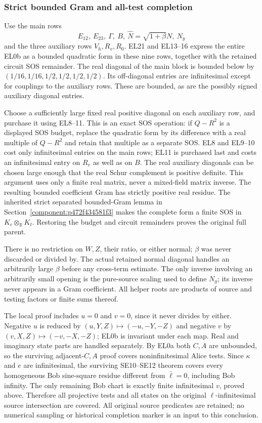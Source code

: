 \subsubsection*{Strict bounded Gram and all-test completion}
Use the main rows
\[
 E_{12},\ E_{23},\ \Gamma,\ B,\ \widehat N=\sqrt{1+\beta}N,
 \ N_y
\]
and the three auxiliary rows $V_h,R_v,R_0$.
EL21 and EL13--16 express the entire EL0b as a bounded quadratic
form in these nine rows, together with the retained circuit SOS
remainder.  The real diagonal of the main block is bounded below
by $(1/16,1/16,1/2,1/2,1/2,1/2)$.
Its off-diagonal entries are infinitesimal except for couplings to
the auxiliary rows.  These are bounded, as are the possibly signed
auxiliary diagonal entries.

Choose a sufficiently large fixed real positive diagonal on each
auxiliary row, and purchase it using EL8--11.  This is an exact
SOS operation: if $Q-R^2$ is a displayed SOS budget, replace the
quadratic form by its difference with a real multiple of $Q-R^2$
and retain that multiple as a separate SOS.  EL8 and EL9--10 cost
only infinitesimal entries on the main rows; EL11 is purchased
last and costs an infinitesimal entry on $R_v$ as well as on $B$.
The real auxiliary diagonals can be chosen large enough that the
real Schur complement is positive definite.  This argument uses
only a finite real matrix, never a mixed-field matrix inverse.
The resulting bounded coefficient Gram has strictly positive real
residue.  The inherited strict separated bounded-Gram lemma in
Section~\ref{component:p472f434581f3} makes the complete form a finite
SOS in $K_c\otimes_{\mathbb R}K_t$.  Restoring the budget and circuit
remainders proves the original full parent.

There is no restriction on $W,Z$, their ratio, or either normal;
$\beta$ was never discarded or divided by.  The actual retained
normal diagonal handles an arbitrarily large $\beta$ before any
cross-term estimate.  The only inverse involving an arbitrarily
small opening is the pure-source scaling used to define $N_y$;
its inverse never appears in a Gram coefficient.  All helper roots
are products of source and testing factors or finite sums thereof.

The local proof includes $u=0$ and $v=0$, since it never divides
by either.  Negative $u$ is reduced by
$(u,Y,Z)\mapsto(-u,-Y,-Z)$ and negative $v$ by
$(v,X,Z)\mapsto(-v,-X,-Z)$; EL0b is invariant under each map.
Real and imaginary state parts are handled separately.
By EL0a both $C,A$ are unbounded, so the surviving adjacent-$C,A$
proof covers noninfinitesimal Alice tests.  Since $\kappa$ and $e$
are infinitesimal, the surviving SE10--SE12 theorem covers every
homogeneous Bob sine-square residue different from $\bar\ell=0$,
including Bob infinity.  The only remaining Bob chart is exactly
finite infinitesimal $v$, proved above.  Therefore all projective
tests and all states on the original $\ell$-infinitesimal source
intersection are covered.  All original source predicates are
retained; no numerical sampling or historical completion marker
is an input to this conclusion.


